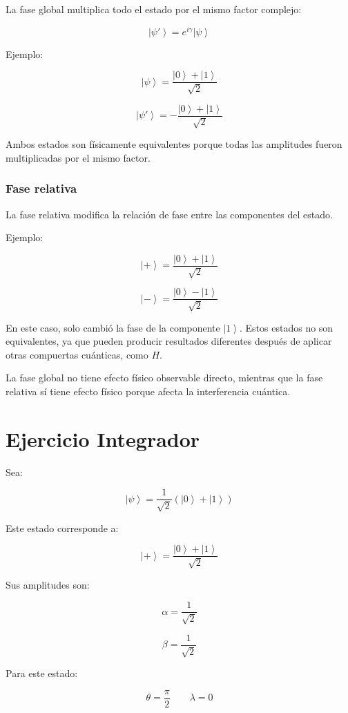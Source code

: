 \documentclass[12pt,a4paper]{article}
\newcommand{\ket}[1]{\left|#1\right\rangle}
\begin{document}
La fase global multiplica todo el estado por el mismo factor complejo:

\[
\ket{\psi'}=e^{i\gamma}\ket{\psi}
\]

Ejemplo:

\[
\ket{\psi}=
\frac{\ket{0}+\ket{1}}{\sqrt{2}}
\]

\[
\ket{\psi'}=
-\frac{\ket{0}+\ket{1}}{\sqrt{2}}
\]

Ambos estados son físicamente equivalentes porque todas las amplitudes fueron multiplicadas por el mismo factor.

\subsubsection*{Fase relativa}

La fase relativa modifica la relación de fase entre las componentes del estado.

Ejemplo:

\[
\ket{+}=
\frac{\ket{0}+\ket{1}}{\sqrt{2}}
\]

\[
\ket{-}=
\frac{\ket{0}-\ket{1}}{\sqrt{2}}
\]

En este caso, solo cambió la fase de la componente \(\ket{1}\). Estos estados no son equivalentes, ya que pueden producir resultados diferentes después de aplicar otras compuertas cuánticas, como \(H\).

\begin{resultado}
La fase global no tiene efecto físico observable directo, mientras que la fase relativa sí tiene efecto físico porque afecta la interferencia cuántica.
\end{resultado}

\section{Ejercicio Integrador}

Sea:

\[
\ket{\psi}=
\frac{1}{\sqrt{2}}(\ket{0}+\ket{1})
\]

Este estado corresponde a:

\[
\ket{+}=
\frac{\ket{0}+\ket{1}}{\sqrt{2}}
\]

Sus amplitudes son:

\[
\alpha=\frac{1}{\sqrt{2}}
\]

\[
\beta=\frac{1}{\sqrt{2}}
\]

Para este estado:

\[
\theta=\frac{\pi}{2}
\qquad
\lambda=0
\]
\end{document}

